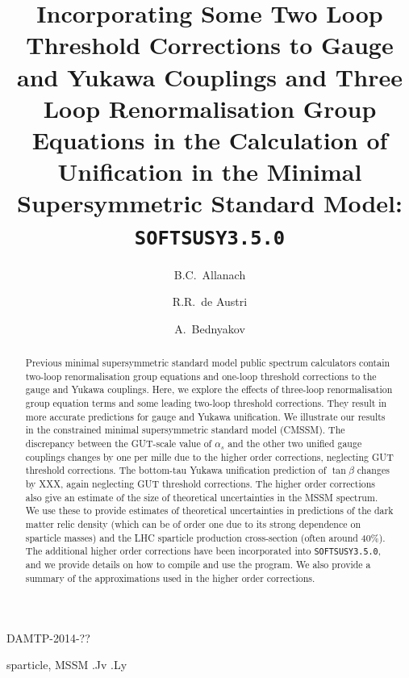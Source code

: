 \documentclass[final,3p,times,pdflatex]{elsarticle}
\begin{document}
\begin{frontmatter}

\begin{flushright}
DAMTP-2014-??
\end{flushright}

\title{Incorporating Some Two Loop Threshold Corrections to Gauge and
  Yukawa Couplings and Three Loop
  Renormalisation Group Equations in the Calculation of Unification in
  the Minimal Supersymmetric Standard Model: {\tt SOFTSUSY3.5.0}}

\author[damtp]{B.C.~Allanach}
\author[valencia]{R.R.~de Austri}
\author[dunba]{A.~Bednyakov}

\address[damtp]{DAMTP, CMS, University of Cambridge, Wilberforce road,
  Cambridge, CB3  0WA, United Kingdom}
\address[valencia]{Instituto de Física Corpuscular | Parque Científico,
  C/Catedrático José Beltrán, 2 | E-46980 Paterna, Spain} 
\address[dubna]{Joint Institute for Nuclear Research, 141980, Dubna, Russia}

\begin{abstract}
  Previous minimal supersymmetric standard model public spectrum calculators
  contain two-loop 
  renormalisation group equations and one-loop threshold corrections to the
  gauge and Yukawa couplings. Here, we explore the effects of three-loop
  renormalisation group equation terms and some leading two-loop threshold
  corrections. They result in more accurate predictions for gauge and Yukawa
  unification. 
  We illustrate our results in the constrained minimal supersymmetric standard
  model (CMSSM). The discrepancy between the GUT-scale value of $\alpha_s$ and
  the other two unified gauge couplings changes by one per mille due to the
  higher order 
  corrections, neglecting GUT threshold corrections. The bottom-tau Yukawa
  unification prediction of $\tan \beta$ 
  changes by XXX, again neglecting GUT threshold corrections. 
  The higher order corrections also give an estimate of the size of
  theoretical uncertainties in the MSSM spectrum. We use these to provide
  estimates 
  of theoretical uncertainties in predictions of the dark matter relic density
  (which can be of order one due to its strong dependence on sparticle masses)
  and the LHC sparticle production cross-section (often around 40$\%$).
  The additional higher order corrections have been
  incorporated into {\tt SOFTSUSY3.5.0}, and we provide details on how to
  compile and use the program. We also provide a summary of the
  approximations used in the higher order corrections. 
\end{abstract}

\begin{keyword}
sparticle, 
MSSM
.Jv
.Ly
\end{keyword}
\end{frontmatter}
\end{document}
